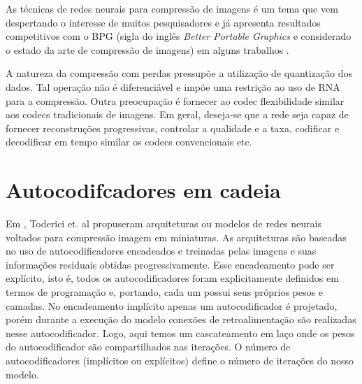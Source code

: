 As técnicas de redes neurais para compressão de imagens é um tema que vem despertando o interesse de muitos pesquisadores e já apresenta resultados competitivos com o BPG (sigla do inglês \textit{Better Portable Graphics} e considerado o estado da arte de compressão de imagens) em alguns trabalhos \cite{Autoregressive2018Minnen,akbari2019dsslic}. 


A natureza da compressão com perdas pressupõe a utilização de quantização dos dados. Tal operação não é diferenciável e impõe uma restrição ao uso de RNA para a compressão. Outra preocupação é fornecer ao codec flexibilidade similar aos codecs tradicionais de imagens. Em geral, deseja-se que a rede seja capaz de fornecer reconstruções progressivas, controlar a qualidade e a taxa, codificar e decodificar  em tempo similar os codecs convencionais etc.



\section{Autocodifcadores em cadeia}

Em \cite{Variable2016Toderici}, Toderici et. al propuseram arquiteturas ou modelos de redes neurais voltados para compressão imagem em miniaturas. As arquiteturas são baseadas no uso de autocodificadores encadeados e treinadas pelas imagens e suas informações residuais obtidas progressivamente. 
Esse encadeamento pode ser explícito, isto é, todos os autocodificadores foram explicitamente definidos em termos de programação e, portando, cada um possui seus próprios pesos e camadas. 
No encadeamento implícito apenas um autocodificador é projetado, porém durante a execução do modelo conexões de retroalimentação são realizadas nesse autocodificador. Logo, aqui temos um cascateamento em laço onde os pesos do autocodificador são compartilhados nas iterações. O número de autocodificadores (implícitos ou explícitos) define o número de iterações do nosso modelo. 

